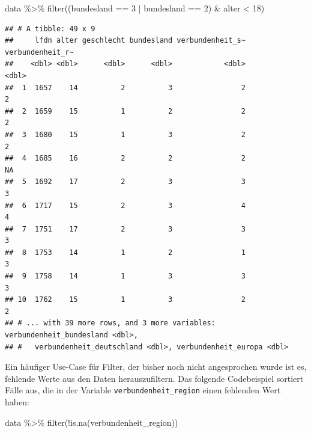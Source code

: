 \documentclass[
]{book}
\newenvironment{Shaded}{\begin{snugshade}}{\end{snugshade}}
\newcommand{\DecValTok}[1]{\textcolor[rgb]{0.00,0.00,0.81}{#1}}
\newcommand{\FunctionTok}[1]{\textcolor[rgb]{0.00,0.00,0.00}{#1}}
\newcommand{\NormalTok}[1]{#1}
\newcommand{\SpecialCharTok}[1]{\textcolor[rgb]{0.00,0.00,0.00}{#1}}
\begin{document}
\begin{Shaded}
\begin{Highlighting}[]
\NormalTok{data }\SpecialCharTok{\%\textgreater{}\%} 
  \FunctionTok{filter}\NormalTok{((bundesland }\SpecialCharTok{==} \DecValTok{3} \SpecialCharTok{|}\NormalTok{ bundesland }\SpecialCharTok{==} \DecValTok{2}\NormalTok{) }\SpecialCharTok{\&}\NormalTok{ alter }\SpecialCharTok{\textless{}} \DecValTok{18}\NormalTok{)}
\end{Highlighting}
\end{Shaded}

\begin{verbatim}
## # A tibble: 49 x 9
##     lfdn alter geschlecht bundesland verbundenheit_s~ verbundenheit_r~
##    <dbl> <dbl>      <dbl>      <dbl>            <dbl>            <dbl>
##  1  1657    14          2          3                2                2
##  2  1659    15          1          2                2                2
##  3  1680    15          1          3                2                2
##  4  1685    16          2          2                2               NA
##  5  1692    17          2          3                3                3
##  6  1717    15          2          3                4                4
##  7  1751    17          2          3                3                3
##  8  1753    14          1          2                1                3
##  9  1758    14          1          3                3                3
## 10  1762    15          1          3                2                2
## # ... with 39 more rows, and 3 more variables: verbundenheit_bundesland <dbl>,
## #   verbundenheit_deutschland <dbl>, verbundenheit_europa <dbl>
\end{verbatim}

Ein häufiger Use-Case für Filter, der bisher noch nicht angesprochen wurde ist es, fehlende Werte aus den Daten herauszufiltern. Das folgende Codebeispiel sortiert Fälle aus, die in der Variable \texttt{verbundenheit\_region} einen fehlenden Wert haben:

\begin{Shaded}
\begin{Highlighting}[]
\NormalTok{data }\SpecialCharTok{\%\textgreater{}\%} 
  \FunctionTok{filter}\NormalTok{(}\SpecialCharTok{!}\FunctionTok{is.na}\NormalTok{(verbundenheit\_region))}
\end{Highlighting}
\end{Shaded}
\end{document}
